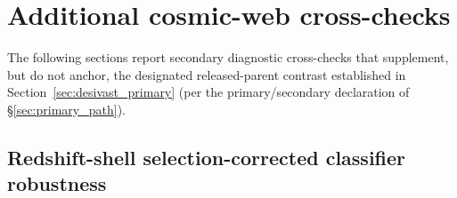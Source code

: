 \documentclass[aps,prd,twocolumn,superscriptaddress,showpacs,preprintnumbers,nofootinbib,longbibliography,floatfix]{revtex4-2}
\begin{document}
\section{Additional cosmic-web cross-checks}\label{sec:additional_cw}

The following sections report secondary diagnostic cross-checks
that supplement, but do not anchor, the designated released-parent
contrast established in
Section~\ref{sec:desivast_primary} (per the primary/secondary
declaration of \S\ref{sec:primary_path}).

\subsection{Redshift-shell selection-corrected classifier
robustness}\label{sec:zshell_robustness}
\end{document}
